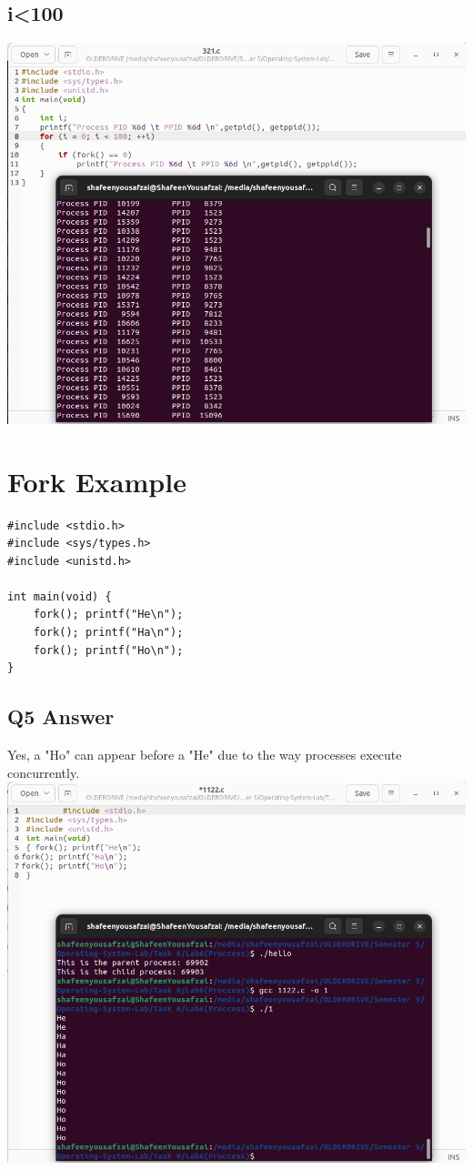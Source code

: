 \documentclass[12pt]{article}
\begin{document}
\subsection{i<100}
  \includegraphics[width=\textwidth]{Screenshot from 2024-09-27 05-39-29.png}

\section{Fork Example}
\begin{verbatim}
#include <stdio.h>
#include <sys/types.h>
#include <unistd.h>

int main(void) {
    fork(); printf("He\n");
    fork(); printf("Ha\n");
    fork(); printf("Ho\n");
}
\end{verbatim}

\subsection{Q5 Answer}
Yes, a "Ho" can appear before a "He" due to the way processes execute concurrently.
  \includegraphics[width=\textwidth]{Screenshot from 2024-09-27 05-44-44.png}
\end{document}
